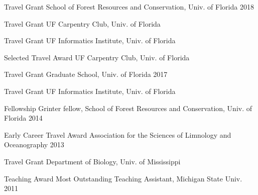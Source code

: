 


\begin{cvhonors}

  \cvhonor
    {Travel Grant} %
    {School of Forest Resources and Conservation, Univ. of Florida} %
    {} %
    {2018} %
    
  \cvhonor
    {Travel Grant} %
    {UF Carpentry Club, Univ. of Florida} %
    {} %
    {} %

  \cvhonor
    {Travel Grant} %
    {UF Informatics Institute, Univ. of Florida} %
    {} %
    {} %
    
  \cvhonor
    {Selected Travel Award} %
    {UF Carpentry Club, Univ. of Florida} %
    {} %
    {} %

  \cvhonor
    {Travel Grant} %
    {Graduate School, Univ. of Florida} %
    {} %
    {2017} %
    
  \cvhonor
    {Travel Grant} %
    {UF Informatics Institute, Univ. of Florida} %
    {} %
    {} %

  \cvhonor
    {Fellowship} %
    {Grinter fellow, School of Forest Resources and Conservation, Univ. of Florida} %
    {} %
    {2014} %

  \cvhonor
    {Early Career Travel Award} %
    {Association for the Sciences of Limnology and Oceanography} %
    {} %
    {2013} %

  \cvhonor
    {Travel Grant} %
    {Department of Biology, Univ. of Mississippi} %
    {} %
    {} %

  \cvhonor
    {Teaching Award} %
    {Most Outstanding Teaching Assistant, Michigan State Univ.} %
    {} %
    {2011} %

\end{cvhonors}
